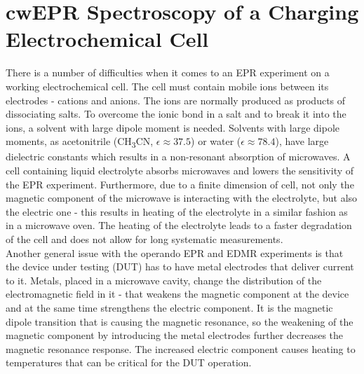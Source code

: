 \section{cwEPR Spectroscopy of a Charging Electrochemical Cell}
There is a number of difficulties when it comes to an EPR experiment on a working electrochemical cell. The cell must contain mobile ions between its electrodes - cations and anions. The ions are normally produced as products of dissociating salts. To overcome the ionic bond in a salt and to break it into the ions, a solvent with large dipole moment is needed. Solvents with large dipole moments, as acetonitrile (CH\textsubscript{3}CN, $\epsilon\approx 37.5$) or water ($\epsilon\approx78.4$), have large dielectric constants which results in a non-resonant absorption of microwaves. A cell containing liquid electrolyte absorbs microwaves and lowers the sensitivity of the EPR experiment. Furthermore, due to a finite dimension of cell, not only the magnetic component of the microwave is interacting with the electrolyte, but also the electric one - this results in heating of the electrolyte in a similar fashion as in a microwave oven. The heating of the electrolyte leads to a faster degradation of the cell and does not allow for long systematic measurements.\\
Another general issue with the operando EPR and EDMR experiments is that the device under testing (DUT) has to have metal electrodes that deliver current to it. Metals, placed in a microwave cavity, change the distribution of the electromagnetic field in it - that weakens the magnetic component at the device and at the same time strengthens the electric component. It is the magnetic dipole transition that is causing the magnetic resonance, so the weakening of the magnetic component by introducing the metal electrodes further decreases the magnetic resonance response. The increased electric component causes heating to temperatures that can be critical for the DUT operation.



